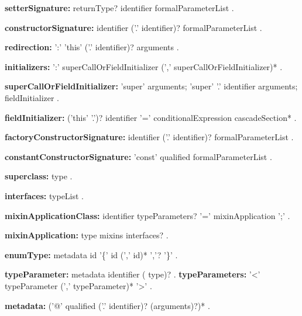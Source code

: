 \begin{grammar}
{\bf setterSignature:}
    returnType? \SET{} identifier formalParameterList
    .
\end{grammar}
\begin{grammar}
{\bf constructorSignature:}
    identifier ('.' identifier)? formalParameterList
    .
\end{grammar}
\begin{grammar}
{\bf redirection:}
    ':' 'this' ('.' identifier)? arguments
    .
\end{grammar}
\begin{grammar}
{\bf initializers:}
    ':' superCallOrFieldInitializer (',' superCallOrFieldInitializer)*
    .

{\bf superCallOrFieldInitializer:}
    'super' arguments;
    'super' '.' identifier arguments;
    fieldInitializer
    .
    
{\bf fieldInitializer:}
    ('this' '.')? identifier '=' conditionalExpression cascadeSection*
    .
\end{grammar}
\begin{grammar}
{\bf factoryConstructorSignature:}
    \FACTORY{} identifier  ('.' identifier)?  formalParameterList
    .
\end{grammar}
\begin{grammar}
{\bf constantConstructorSignature:}
    'const' qualified formalParameterList
    .
\end{grammar}
\begin{grammar}
{\bf superclass:}
    \EXTENDS{} type
    .
\end{grammar}
\begin{grammar}
{\bf interfaces:}
    \IMPLEMENTS{} typeList
    .
\end{grammar}
\begin{grammar}
{\bf  mixinApplicationClass:}
    identifier typeParameters? '='  mixinApplication ';'
    .

{\bf mixinApplication:}
    type mixins interfaces? 
    .
\end{grammar}
\begin{grammar}
{\bf enumType:}
    metadata \ENUM{} id '\{' id (',' id)* ','? '\}'
    .
\end{grammar}
\begin{grammar}
{\bf typeParameter:}
    metadata identifier (\EXTENDS{} type)?
    .
{\bf typeParameters:}
    '<' typeParameter (',' typeParameter)* '>'
    .
\end{grammar}
\begin{grammar}
{\bf metadata:}
    ('@' qualified ('.' identifier)? (arguments)?)*
    .
\end{grammar}
